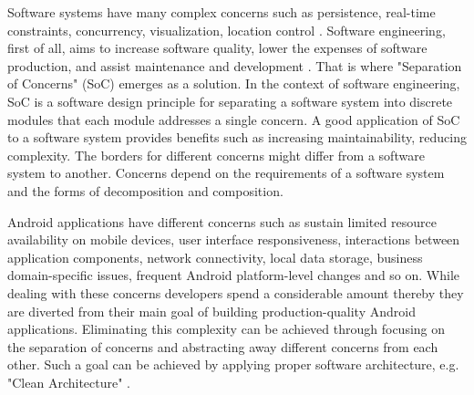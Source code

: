 Software systems have many complex concerns such as persistence, real-time constraints, concurrency, visualization, location control \cite{27}. Software engineering, first of all, aims to increase software quality, lower the expenses of software production, and assist maintenance and development \cite{28}. That is where "Separation of Concerns" (SoC) emerges as a solution. In the context of software engineering, SoC is a software design principle for separating a software system into discrete modules that each module addresses a single concern. A good application of SoC to a software system provides benefits such as increasing maintainability, reducing complexity. The borders for different concerns might differ from a software system to another. Concerns depend on the requirements of a software system and the forms of decomposition and composition. 

Android applications have different concerns such as sustain limited resource availability on mobile devices, user interface responsiveness,  interactions between application components,  network connectivity, local data storage, business domain-specific issues, frequent Android platform-level changes and so on. While dealing with these concerns developers spend a considerable amount thereby they are diverted from their main goal of building production-quality Android applications. Eliminating this complexity can be achieved through focusing on the separation of concerns and abstracting away different concerns from each other. Such a goal can be achieved by applying proper software architecture, e.g. "Clean Architecture" \cite{56}.